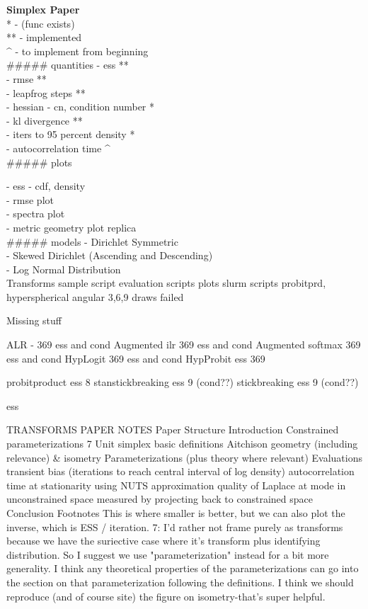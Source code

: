 \noindent \textbf{\Huge Simplex Paper}\\[0.3cm]


* - (func exists)\\
** - implemented\\
^ - to implement from beginning\\
##### quantities
- ess **\\
- rmse **\\
- leapfrog steps **\\
- hessian - cn, condition number *\\
- kl divergence **\\
- iters to 95 percent density *\\
- autocorrelation time ^\\

##### plots

- ess - cdf, density\\
- rmse plot\\
- spectra plot\\
- metric geometry plot replica\\

##### models
- Dirichlet Symmetric\\
- Skewed Dirichlet (Ascending and Descending)\\
- Log Normal Distribution\\


Transforms
sample script
evaluation scripts
plots
slurm scripts
probitprd, hyperspherical angular 3,6,9 draws failed

Missing stuff

ALR - 369 ess and cond
Augmented ilr 369 ess and cond
Augmented softmax 369 ess and cond
HypLogit 369 ess and cond
HypProbit ess 369

probitproduct ess 8
stanstickbreaking ess 9 (cond??)
stickbreaking ess 9 (cond??)

ess

TRANSFORMS PAPER NOTES
Paper Structure
Introduction
Constrained parameterizations 7
Unit simplex
basic definitions
Aitchison geometry (including relevance) & isometry
Parameterizations (plus theory where relevant)
Evaluations
transient bias (iterations to reach central interval of log density)
autocorrelation time at stationarity using NUTS
approximation quality of Laplace at mode in unconstrained space measured by projecting back to constrained space
Conclusion
Footnotes
This is where smaller is better, but we can also plot the inverse, which is ESS / iteration.
7: I'd rather not frame purely as transforms because we have the suriective case where it's transform plus identifying distribution. So I suggest we use "parameterization" instead for a bit more generality. I think any theoretical properties of the parameterizations can go into the section on that parameterization following the definitions. I think we should reproduce (and of course site) the figure on isometry-that's super helpful.